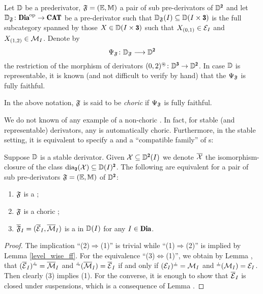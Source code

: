 \color{blue}
Let $\mathbb{D}$ be a prederivator, $\mathfrak{F}=(\mathbb E,\mathbb M)$ a pair of sub pre-derivators of $\D^\due$ and let 
$\D_\F\colon \Dia^\opp\to \Cat$
be a pre-derivator such that $\D_{\F}(I)\subseteq \D(I\times \tre)$ is the full subcategory spanned by those $X\in  \D(I\times \tre)$ such that $X_{(0,1)}\in \mathcal{E}_I$ and $X_{(1,2)}\in \mathcal{M}_I$. Denote by 
\begin{equation}\label{composition_morphism}
\Psi_\F\colon \D_\F\longrightarrow \D^{\due}
\end{equation}
the restriction of the morphism of derivators $(0,2)^\circledast\colon\D^{\tre}\to \D^{\due}$. In case $\mathbb{D}$ is representable, it is known (and not difficult to verify by hand) that the $\Psi_{\mathfrak{F}}$ is fully faithful. 

\begin{definition}
In the above notation, $\mathfrak{F}$ is said to be \emph{choric} if $\Psi_{\mathfrak{F}}$ is fully faithful. 
\end{definition}

We do not known of any example of a non-choric \dpfs. In fact, for stable (and representable) derivators, any \dpfs is automatically choric. Furthermore, in the stable setting,  it is equivalent to specify a \dpfs and a ``compatible family'' of {\phfs}s: 
\color{black}
\begin{theorem}\label{stable_equv_orth_pre}
Suppose $\mathbb{D}$ is a stable derivator. Given $\class{X}\subseteq \D^\due(I)$ we denote $\overline{\mathcal{X}}$ the isomorphism\hyp{}closure of the class $\dia_\due(\class{X})\subseteq \D(I)^\due$. The following are equivalent for a pair of sub pre-derivators $\mathfrak{F}=(\mathbb E,\mathbb M)$  of $\D^{\due}$:
\begin{enumerate}%
\item $\mathfrak{F}$ is a \cpfs;
\item \color{blue}$\mathfrak{F}$ is a choric \cpfs;\color{black}
\item $\overline{\mathfrak{F}}_I=(\overline{\mathcal{E}}_I,\overline{\mathcal{M}}_I)$ is a \phfs in $\mathbb{D}(I)$ for any $I\in\Dia$.
\end{enumerate}
\end{theorem}
\begin{proof}
The implication ``(2)$\Rightarrow$(1)'' is trivial while ``(1)$\Rightarrow$(2)'' is implied by Lemma \ref{level_wise_ff}. 
For the equivalence ``(3)$\Leftrightarrow$(1)'', we obtain by  Lemma , that $(\overline\E_I)^{\horth}=\overline\M_I$ and ${}^{\horth}(\overline\M_I)=\overline\E_I$ if and only if $(\E_I)^{\corth}=\M_I$ and ${}^{\corth}(\M_I)=\E_I$. Then clearly (3) implies (1). For the converse, it is enough to show that $\overline{\mathcal{E}}_I$ is closed under suspensions, which is a consequence of Lemma .
\end{proof}









